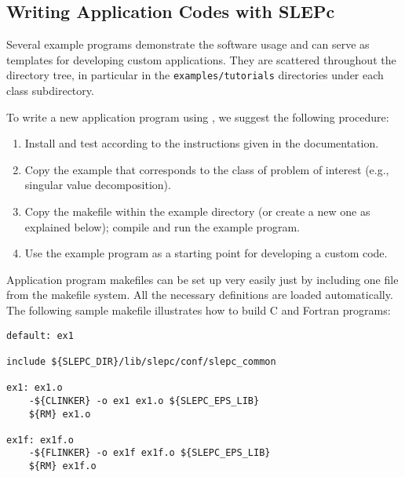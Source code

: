 \subsection{Writing Application Codes with SLEPc}

Several example programs demonstrate the software usage and can serve as templates for developing custom applications. They are scattered throughout the \slepc directory tree, in particular in the \Verb!examples/tutorials! directories under each class subdirectory.

To write a new application program using \slepc, we suggest the following procedure:
\begin{enumerate}
\item Install and test \slepc according to the instructions given in the documentation.
\item Copy the \slepc example that corresponds to the class of problem of interest (e.g., singular value decomposition).
\item Copy the makefile within the example directory (or create a new one as explained below); compile and run the example program.
\item Use the example program as a starting point for developing a custom code.
\end{enumerate}

	Application program makefiles can be set up very easily just by including one file from the \slepc makefile system. All the necessary \petsc{} definitions are loaded automatically. The following sample makefile illustrates how to build C and Fortran programs:

	\begin{Verbatim}[fontsize=\small]
default: ex1

include ${SLEPC_DIR}/lib/slepc/conf/slepc_common

ex1: ex1.o
	-${CLINKER} -o ex1 ex1.o ${SLEPC_EPS_LIB}
	${RM} ex1.o

ex1f: ex1f.o
	-${FLINKER} -o ex1f ex1f.o ${SLEPC_EPS_LIB}
	${RM} ex1f.o
	\end{Verbatim}


